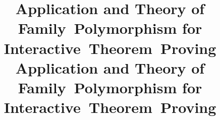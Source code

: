 \def\thetitle{%
Application and Theory of \mbox{Family Polymorphism} for \mbox{Interactive Theorem Proving}
}

\ifreport
\title{\thetitle}
\else
\title{\thetitle}
\fi


\newcommand{\TT}{\mbox{\textls[-20]{FMLTT}}\xspace}
\newcommand{\Lang}{\mbox{\scshape\textls[-10]{fpop}}\xspace}
